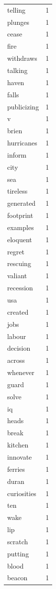 \begin{tabular}{lr}
telling & 1 \\
plunges & 1 \\
cease & 1 \\
fire & 1 \\
withdraws & 1 \\
talking & 1 \\
haven & 1 \\
falls & 1 \\
publicizing & 1 \\
v & 1 \\
brien & 1 \\
hurricanes & 1 \\
inform & 1 \\
city & 1 \\
sea & 1 \\
tireless & 1 \\
generated & 1 \\
footprint & 1 \\
examples & 1 \\
eloquent & 1 \\
regret & 1 \\
rescuing & 1 \\
valiant & 1 \\
recession & 1 \\
usa & 1 \\
created & 1 \\
jobs & 1 \\
labour & 1 \\
decision & 1 \\
across & 1 \\
whenever & 1 \\
guard & 1 \\
solve & 1 \\
iq & 1 \\
heads & 1 \\
break & 1 \\
kitchen & 1 \\
innovate & 1 \\
ferries & 1 \\
duran & 1 \\
curiosities & 1 \\
ten & 1 \\
wake & 1 \\
lip & 1 \\
scratch & 1 \\
putting & 1 \\
blood & 1 \\
beacon & 1 \\

\end{tabular}
